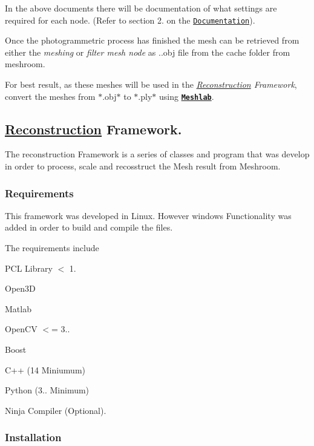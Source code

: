 In the above documents there will be documentation of what settings are required for each node. (Refer to section 2. on the \href{https://github.com/esteban-andrade/3D-Reconstructrion-Scanner/blob/main/A21%20-%2004017%20Final%20Report%20Esteban%20Andrade%20Zambrano.pdf}{\tt Documentation}).

Once the photogrammetric process has finished the mesh can be retrieved from either the {\itshape meshing} or {\itshape filter mesh node} as ..obj file from the cache folder from meshroom.

For best result, as these meshes will be used in the {\itshape \hyperlink{classReconstruction}{Reconstruction} Framework}, convert the meshes from $\ast$.obj$\ast$ to $\ast$.ply$\ast$ using {\bfseries \href{https://www.meshlab.net/}{\tt Meshlab}}.

\subsection*{\hyperlink{classReconstruction}{Reconstruction} Framework.}

The reconstruction Framework is a series of classes and program that was develop in order to process, scale and recosstruct the Mesh result from Meshroom.

\subsubsection*{Requirements}

This framework was developed in Linux. However windows Functionality was added in order to build and compile the files.

The requirements include


\begin{DoxyItemize}
\item P\+CL Library $<$ 1.
\item Open3D
\item Matlab
\item Open\+CV $<$= 3..
\item Boost
\item C++ (14 Miniumum)
\item Python (3.. Minimum)
\item Ninja Compiler (Optional).
\end{DoxyItemize}

\subsubsection*{Installation}

